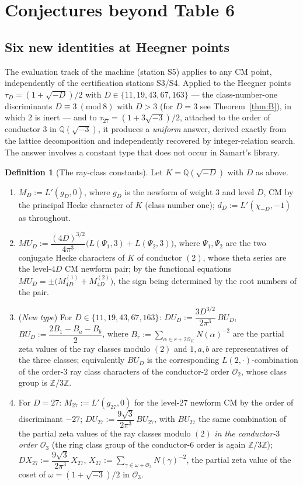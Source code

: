 \documentclass[11pt]{article}
\newcommand{\Qq}{\mathbb{Q}}
\newcommand{\Zz}{\mathbb{Z}}
\newcommand{\OO}{\mathcal{O}}
\theoremstyle{definition}
\newtheorem{definition}[theorem]{Definition}
\theoremstyle{remark}
\begin{document}
\section{Conjectures beyond Table 6}\label{sec:conj}

\subsection{Six new identities at Heegner points}\label{subsec:rayconj}

The evaluation track of the machine (station S5) applies to any CM
point, independently of the certification stations S3/S4. Applied to
the Heegner points $\tau_D=(1+\sqrt{-D})/2$ with
$D\in\{11,19,43,67,163\}$ --- the class-number-one discriminants
$D\equiv3\ (\mathrm{mod}\ 8)$ with $D>3$ (for $D=3$ see
Theorem~\ref{thm:B}), in which $2$ is inert --- and to
$\tau_{27}=(1+3\sqrt{-3})/2$, attached to the order of conductor $3$
in $\Qq(\sqrt{-3})$, it produces a \emph{uniform} answer, derived
exactly from the lattice decomposition and independently recovered
by integer-relation search. The answer involves a constant type that
does not occur in Samart's library.

\begin{definition}[The ray-class constants]\label{def:ray}
Let $K=\Qq(\sqrt{-D})$ with $D$ as above.
\begin{enumerate}
\item $M_D:=L'(g_D,0)$, where $g_D$ is the newform of weight $3$
and level $D$, CM by the principal Hecke character of $K$ (class
number one); $d_D:=L'(\chi_{-D},-1)$ as throughout.
\item $MU_D:=\dfrac{(4D)^{3/2}}{4\pi^3}
\bigl(L(\Psi_1,3)+L(\Psi_2,3)\bigr)$, where $\Psi_1,\Psi_2$ are the
two conjugate Hecke characters of $K$ of conductor $(2)$, whose
theta series are the level-$4D$ CM newform pair; by the functional
equations $MU_D=\pm\bigl(M_{4D}^{(1)}+M_{4D}^{(2)}\bigr)$, the sign
being determined by the root numbers of the pair.
\item (\emph{New type}) For $D\in\{11,19,43,67,163\}$:
$DU_D:=\dfrac{3D^{3/2}}{2\pi^3}\,BU_D$,
$BU_D:=\dfrac{2B_1-B_a-B_b}{2}$, where
$B_r:=\displaystyle\sum_{\alpha\in r+2\OO_K}N(\alpha)^{-2}$
are the partial zeta values of the ray classes modulo $(2)$ and
$1,a,b$ are representatives of the three classes; equivalently
$BU_D$ is the corresponding $L(2,\cdot)$-combination of the
order-$3$ ray class characters of the conductor-$2$ order
$\OO_2$, whose class group is $\Zz/3\Zz$.
\item For $D=27$: $M_{27}:=L'(g_{27},0)$ for the level-$27$ newform
CM by the order of discriminant $-27$;
$DU_{27}:=\dfrac{9\sqrt3}{2\pi^3}\,BU_{27}$, with $BU_{27}$ the
same combination of the partial zeta values of the ray classes
modulo $(2)$ \emph{in the conductor-$3$ order $\OO_3$} (the ring
class group of the conductor-$6$ order is again $\Zz/3\Zz$);
$DX_{27}:=\dfrac{9\sqrt3}{2\pi^3}\,X_{27}$,
$X_{27}:=\displaystyle\sum_{\gamma\in\omega+\OO_3}N(\gamma)^{-2}$,
the partial zeta value of the coset of $\omega=(1+\sqrt{-3})/2$ in
$\OO_3$.
\end{enumerate}
\end{definition}
\end{document}

